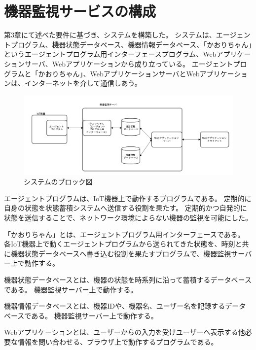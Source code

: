 \section{機器監視サービスの構成}
第3章にて述べた要件に基づき、システムを構築した。
システムは、エージェントプログラム、機器状態データベース、機器情報データベース、「かおりちゃん」というエージェントプログラム用インターフェースプログラム、Webアプリケーションサーバ、Webアプリケーションから成り立っている。
エージェントプログラムと「かおりちゃん」、WebアプリケーションサーバとWebアプリケーションは、インターネットを介して通信しあう。
\medskip

\begin{figure}[htbp]
\includegraphics[width=16cm]{images/blockdiagram2.png}
\caption{システムのブロック図}
\label{fig:blockdiagram}
\end{figure}

エージェントプログラムは、IoT機器上で動作するプログラムである。
定期的に自身の状態を状態蓄積システムへ送信する役割を果たす。
定期的かつ自発的に状態を送信することで、ネットワーク環境によらない機器の監視を可能にした。
\medskip

「かおりちゃん」とは、エージェントプログラム用インターフェースである。
各IoT機器上で動くエージェントプログラムから送られてきた状態を、時刻と共に機器状態データベースへ書き込む役割を果たすプログラムで、機器監視サーバー上で動作する。
\medskip

機器状態データベースとは、機器の状態を時系列に沿って蓄積するデータベースである。
機器監視サーバー上で動作する。
\medskip

機器情報データベースとは、機器IDや、機器名、ユーザー名を記録するデータベースである。
機器監視サーバー上で動作する。
\medskip

Webアプリケーションとは、ユーザーからの入力を受けユーザーへ表示する他必要な情報を問い合わせる、ブラウザ上で動作するプログラムである。
\medskip

